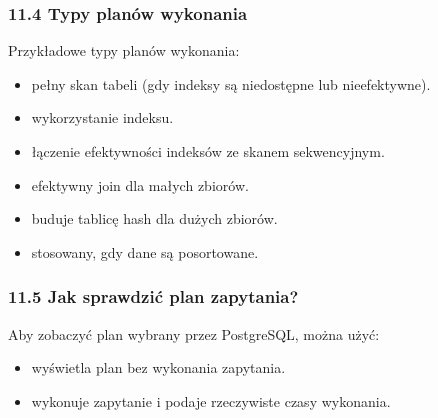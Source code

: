 \documentclass[letterpaper,10pt,polish]{sphinxmanual}
\begin{document}
\subsubsection{11.4 Typy planów wykonania}
\label{\detokenize{rozdzial2/Konfiguracja_baz_danych/Konfiguracja_baz_danych:typy-planow-wykonania}}
\sphinxAtStartPar
Przykładowe typy planów wykonania:
\begin{itemize}
\item {} 
\sphinxAtStartPar
{} \textendash{} pełny skan tabeli (gdy indeksy są niedostępne lub nieefektywne).

\item {} 
\sphinxAtStartPar
{} \textendash{} wykorzystanie indeksu.

\item {} 
\sphinxAtStartPar
{} \textendash{} łączenie efektywności indeksów ze skanem sekwencyjnym.

\item {} 
\sphinxAtStartPar
{} \textendash{} efektywny join dla małych zbiorów.

\item {} 
\sphinxAtStartPar
{} \textendash{} buduje tablicę hash dla dużych zbiorów.

\item {} 
\sphinxAtStartPar
{} \textendash{} stosowany, gdy dane są posortowane.

\end{itemize}


\subsubsection{11.5 Jak sprawdzić plan zapytania?}
\label{\detokenize{rozdzial2/Konfiguracja_baz_danych/Konfiguracja_baz_danych:jak-sprawdzic-plan-zapytania}}
\sphinxAtStartPar
Aby zobaczyć plan wybrany przez PostgreSQL, można użyć:

\begin{sphinxVerbatim}[commandchars=\\\{\}]
         
\end{sphinxVerbatim}
\begin{itemize}
\item {} 
\sphinxAtStartPar
{} \textendash{} wyświetla plan bez wykonania zapytania.

\item {} 
\sphinxAtStartPar
{} \textendash{} wykonuje zapytanie i podaje rzeczywiste czasy wykonania.

\end{itemize}
\end{document}
